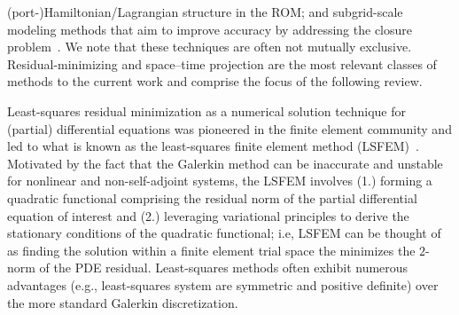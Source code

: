 \documentclass[3p,computermodern,10pt]{elsarticle}
\begin{document}
(port-)Hamiltonian/Lagrangian structure
\cite{carlberg2012spd,structurePreserveBeattie,chaturantabut2016structure,farhat2014dimensional,LALL2003304} in the ROM; and subgrid-scale
modeling methods that aim to improve accuracy by addressing the closure
problem~\cite{san_iliescu_geostrophic,iliescu_pod_eddyviscosity,iliescu_vms_pod_ns,Bergmann_pod_vms,iliescu_ciazzo_residual_rom,Wang_ROM_thesis,wentland_apg,Wang:269133,San2018}.
We note that these techniques are often not mutually exclusive.
Residual-minimizing and space--time projection are the most relevant classes of
methods to the current work and comprise the focus of the following review.



Least-squares residual minimization as a numerical solution technique for (partial) differential equations was pioneered in the finite element community and led to what is known as the least-squares finite element method (LSFEM)~\cite{ls_review,bochev_leastsquares}. Motivated by the fact that the Galerkin method can be inaccurate and unstable for nonlinear and non-self-adjoint systems, the LSFEM involves (1.) forming a quadratic functional comprising the residual norm of the partial differential equation of interest and (2.) leveraging variational principles to derive the stationary conditions of the quadratic functional; i.e, LSFEM can be thought of as finding the solution within a finite element trial space the minimizes the $2$-norm of the PDE residual. Least-squares methods often exhibit numerous advantages (e.g., least-squares system are symmetric and positive definite) over the more standard Galerkin discretization. 
\end{document}
